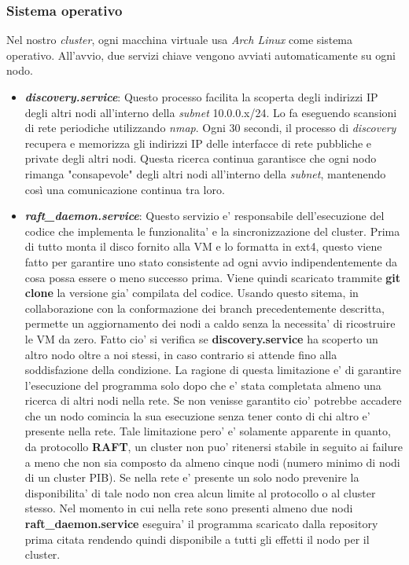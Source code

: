 \subsubsection{Sistema operativo}
Nel nostro \textit{cluster}, ogni macchina virtuale usa \textit{Arch Linux} come 
sistema operativo. 
All'avvio, due servizi chiave vengono avviati automaticamente su ogni nodo.
\begin{itemize}
    \item \textit{\textbf{discovery.service}}: Questo processo facilita la scoperta degli indirizzi IP degli altri nodi all'interno della \textit{subnet} 10.0.0.x/24. Lo fa eseguendo scansioni di rete periodiche utilizzando 
        \textit{nmap}. Ogni 30 secondi, il processo di \textit{discovery} recupera e memorizza gli indirizzi IP delle interfacce di rete pubbliche e private degli altri nodi. Questa ricerca continua garantisce che ogni nodo 
        rimanga "consapevole" degli altri nodi all'interno della \textit{subnet}, mantenendo così una comunicazione continua tra loro.
  \item \textit{\textbf{raft\_daemon.service}}: 
        Questo servizio e' responsabile dell'esecuzione del codice che implementa le funzionalita' 
        e la sincronizzazione del cluster. Prima di tutto monta il disco fornito alla VM e lo formatta
        in ext4, questo viene fatto per garantire uno stato consistente ad ogni avvio 
        indipendentemente da cosa possa essere o meno successo prima.
        Viene quindi scaricato trammite \textbf{git clone} la versione gia' compilata del codice.
        Usando questo sitema, in collaborazione con la conformazione dei branch precedentemente
        descritta, permette un aggiornamento dei nodi a caldo senza la necessita' di ricostruire
        le VM da zero. Fatto cio' si verifica se \textbf{discovery.service} ha scoperto un altro 
        nodo oltre a noi stessi, in caso contrario si attende fino alla soddisfazione della condizione.
        La ragione di questa limitazione e' di garantire l'esecuzione del programma solo dopo 
        che e' stata completata almeno una ricerca di altri nodi nella rete.
        Se non venisse garantito cio' potrebbe accadere che un nodo comincia la sua esecuzione senza
        tener conto di chi altro e' presente nella rete.
        Tale limitazione pero' e' solamente apparente in quanto, da protocollo \textbf{RAFT}, 
        un cluster non puo' ritenersi stabile in seguito ai failure a meno che non sia composto da 
        almeno cinque nodi (numero minimo di nodi di un cluster PIB). Se nella rete
        e' presente un solo nodo prevenire la disponibilita' di tale nodo non crea alcun limite
        al protocollo o al cluster stesso. Nel momento in cui nella rete sono presenti almeno due
        nodi \textbf{raft\_daemon.service} eseguira' il programma scaricato dalla repository prima
        citata rendendo quindi disponibile a tutti gli effetti il nodo per il cluster.
\end{itemize}


